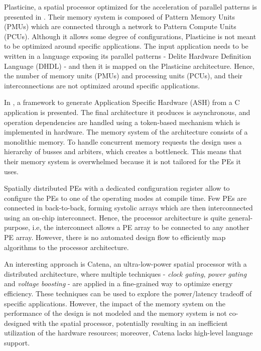 Plasticine, a spatial processor optimized for the acceleration of parallel patterns is presented in \cite{prabhakar2017plasticine}. Their memory system is composed of Pattern Memory Units (PMUs) which are connected through a network to Pattern Compute Units (PCUs). Although it allows some degree of configurations, Plasticine is not meant to be optimized around specific applications. The input application needs to be written in a language exposing its parallel patterns - Delite Hardware Definition Language (DHDL) - and then it is mapped on the Plasticine architecture. Hence, the number of memory units (PMUs) and processing units (PCUs), and their interconnections are not optimized around specific applications.

In \cite{budiu2004spatial}, a framework to generate Application Specific Hardware (ASH) from a C application is presented. The final architecture it produces is asynchronous, and operation dependencies are handled using a token-based mechanism which is implemented in hardware. The memory system of the architecture consists of a monolithic memory. To handle concurrent memory requests the design uses a hierarchy of busses and arbiters, which creates a bottleneck. This means that their memory system is overwhelmed because it is not tailored for the PEs it uses.

Spatially distributed PEs with a dedicated configuration register allow to configure the PEs to one of the operating modes \cite{streamproc2019} at compile time. Few PEs are connected in back-to-back, forming systolic arrays which are then interconnected using an on-chip interconnect. Hence, the processor architecture is quite general-purpose, i.e, the interconnect allows a PE array to be connected to any another PE array. However, there is no automated design flow to efficiently map algorithms to the processor architecture.

An interesting approach is Catena\cite{cerqueira2020catena}, an ultra-low-power spatial processor with a distributed architecture, where multiple techniques - \textit{clock gating}, \textit{power gating} and \textit{voltage boosting} - are applied in a fine-grained way to optimize energy efficiency. These techniques can be used to explore the power/latency tradeoff of specific applications. However, the impact of the memory system on the performance of the design is not modeled and the memory system is not co-designed with the spatial processor, potentially resulting in an inefficient utilization of the hardware resources; moreover, Catena lacks high-level language support.

